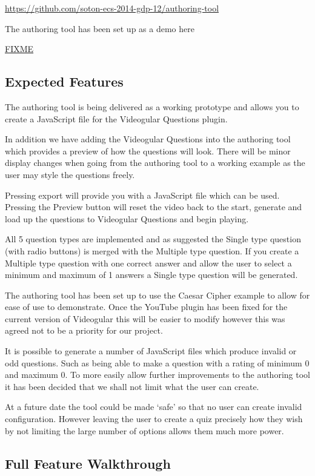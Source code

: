 \documentclass[12pt,a4paper]{article}
\begin{document}
\url{https://github.com/soton-ecs-2014-gdp-12/authoring-tool}

The authoring tool has been set up as a demo here

\url{FIXME}

\subsection{Expected Features}

The authoring tool is being delivered as a working prototype and allows you to create a JavaScript file for the Videogular Questions plugin.

In addition we have adding the Videogular Questions into the authoring tool which provides a preview of how the questions will look. There will be minor display changes when going from the authoring tool to a working example as the user may style the questions freely.

Pressing export will provide you with a JavaScript file which can be used. Pressing the Preview button will reset the video back to the start, generate and load up the questions to Videogular Questions and begin playing.

All 5 question types are implemented and as suggested the Single type question (with radio buttons) is merged with the Multiple type question. If you create a Multiple type question with one correct answer and allow the user to select a minimum and maximum of 1 answers a Single type question will be generated.

The authoring tool has been set up to use the Caesar Cipher example to allow for ease of use to demonstrate. Once the YouTube plugin has been fixed for the current version of Videogular this will be easier to modify however this was agreed not to be a priority for our project.

It is possible to generate a number of JavaScript files which produce invalid or odd questions. Such as being able to make a question with a rating of minimum 0 and maximum 0. To more easily allow further improvements to the authoring tool it has been decided that we shall not limit what the user can create.

At a future date the tool could be made `safe' so that no user can create invalid configuration. However leaving the user to create a quiz precisely how they wish by not limiting the large number of options allows them much more power.

\subsection{Full Feature Walkthrough}
\end{document}
